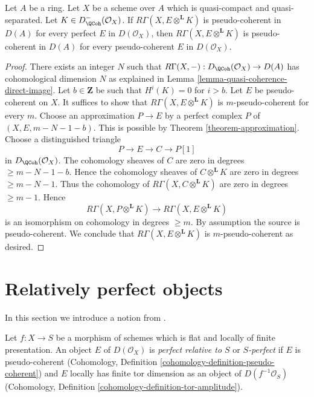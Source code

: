\begin{lemma}
\label{lemma-perfect-enough}
Let $A$ be a ring. Let $X$ be a scheme over $A$ which is quasi-compact
and quasi-separated. Let $K \in D^-_\QCoh(\mathcal{O}_X)$.
If $R\Gamma(X, E \otimes^\mathbf{L} K)$ is pseudo-coherent
in $D(A)$ for every perfect $E$ in $D(\mathcal{O}_X)$,
then $R\Gamma(X, E \otimes^\mathbf{L} K)$ is pseudo-coherent
in $D(A)$ for every pseudo-coherent $E$ in $D(\mathcal{O}_X)$.
\end{lemma}

\begin{proof}
There exists an integer $N$ such that
$R\Gamma(X, -) : D_\QCoh(\mathcal{O}_X) \to D(A)$
has cohomological dimension $N$ as explained in
Lemma \ref{lemma-quasi-coherence-direct-image}.
Let $b \in \mathbf{Z}$ be such that $H^i(K) = 0$ for $i > b$.
Let $E$ be pseudo-coherent on $X$.
It suffices to show that $R\Gamma(X, E \otimes^\mathbf{L} K)$
is $m$-pseudo-coherent for every $m$.
Choose an approximation $P \to E$ by a perfect complex $P$
of $(X, E, m - N - 1 - b)$. This is possible by
Theorem \ref{theorem-approximation}.
Choose a distinguished triangle
$$
P \to E \to C \to P[1]
$$
in $D_\QCoh(\mathcal{O}_X)$. The cohomology sheaves of $C$ are zero
in degrees $\geq m - N - 1 - b$. Hence the cohomology
sheaves of $C \otimes^\mathbf{L} K$ are zero in degrees $\geq m - N - 1$.
Thus the cohomology of $R\Gamma(X, C \otimes^\mathbf{L} K)$
are zero in degrees $\geq m - 1$. Hence
$$
R\Gamma(X, P \otimes^\mathbf{L} K) \to R\Gamma(X, E \otimes^\mathbf{L} K)
$$
is an isomorphism on cohomology in degrees $\geq m$.
By assumption the source is pseudo-coherent.
We conclude that $R\Gamma(X, E \otimes^\mathbf{L} K)$
is $m$-pseudo-coherent as desired.
\end{proof}









\section{Relatively perfect objects}
\label{section-relatively-perfect}

\noindent
In this section we introduce a notion from
\cite{lieblich-complexes}.

\begin{definition}
\label{definition-relatively-perfect}
Let $f : X \to S$ be a morphism of schemes which is flat and
locally of finite presentation. An object $E$ of $D(\mathcal{O}_X)$ is
{\it perfect relative to $S$} or
{\it $S$-perfect} if $E$ is pseudo-coherent
(Cohomology, Definition \ref{cohomology-definition-pseudo-coherent}) and
$E$ locally has finite tor dimension as an object of
$D(f^{-1}\mathcal{O}_S)$
(Cohomology, Definition \ref{cohomology-definition-tor-amplitude}).
\end{definition}

